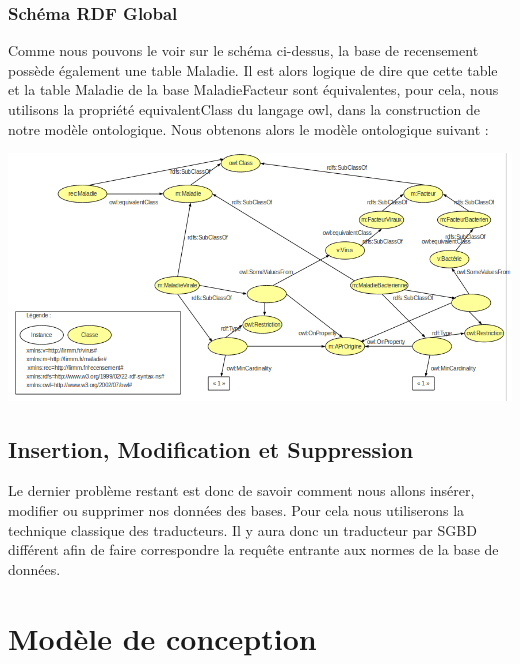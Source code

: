 \documentclass[12pt]{article}
\begin{document}
\subsubsection{Schéma RDF Global}

Comme nous pouvons le voir sur le schéma ci-dessus, la base de recensement possède également une table Maladie. Il est alors logique de dire que cette table et la table Maladie de la base MaladieFacteur sont équivalentes, pour cela, nous utilisons la propriété equivalentClass du langage owl, dans la construction de notre modèle ontologique. Nous obtenons alors le modèle ontologique suivant :

\begin{center}
	\includegraphics[scale=0.50]{images/rdf-global.png}
\end{center}

\subsection{Insertion, Modification et Suppression}
	
	Le dernier problème restant est donc de savoir comment nous allons insérer, modifier ou supprimer nos données des bases. Pour cela nous utiliserons la technique classique des traducteurs. Il y aura donc un traducteur par SGBD différent afin de faire correspondre la requête entrante aux normes de la base de données.

\newpage

\section{Modèle de conception}
\end{document}
